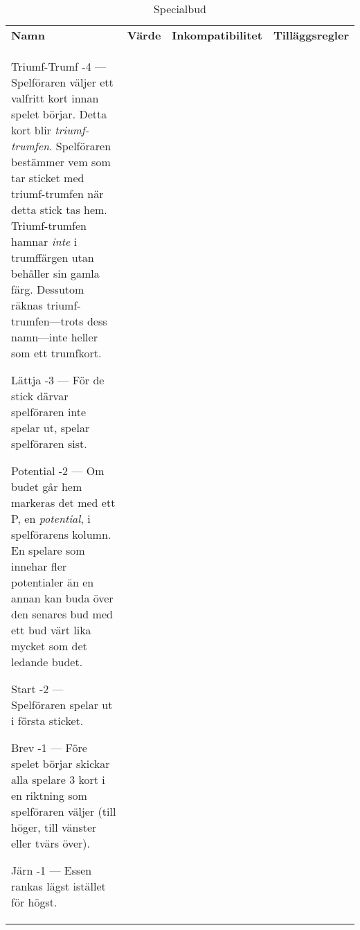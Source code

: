 %
%
%
%

\begin{table}
	\caption{Specialbud}\label{tab:specialBids}
	\begin{center}
		\begin{tabularx}{\textwidth}{
			l
			S[table-number-alignment=center, table-format=1.0]
			p{3cm}
			|X
		}
			\textbf{Namn} &
			\textbf{Värde} &
			\textbf{Inkompatibilitet} &
			\textbf{Tilläggsregler}
			\\[-3ex]

			\specialBidItem%
			{Triumf-Trumf}
			{-4}
			{---}
			{%
				Spelföraren väljer ett valfritt kort innan spelet börjar. Detta kort blir \emph{triumf-trumfen}. Spelföraren bestämmer vem som tar sticket med triumf-trumfen när detta stick tas hem. Triumf-trumfen hamnar \emph{inte} i trumffärgen utan behåller sin gamla färg. Dessutom räknas triumf-trumfen---trots dess namn---inte heller som ett trumfkort.
			}

			\specialBidItem%
			{Lättja}
			{-3}
			{---}
			{%
				För de stick därvar spelföraren inte spelar ut, spelar spelföraren sist.
			}

			\specialBidItem%
			{Potential}
			{-2}
			{---}
			{%
				Om budet går hem markeras det med ett P, en \emph{potential}, i spelförarens kolumn. En spelare som innehar fler potentialer än en annan kan buda över den senares bud med ett bud värt lika mycket som det ledande budet.
			}

			\specialBidItem%
			{Start}
			{-2}
			{---}
			{%
				Spelföraren spelar ut i första sticket.
			}

			\specialBidItem%
			{Brev}
			{-1}
			{---}
			{%
				Före spelet börjar skickar alla spelare 3 kort i en riktning som spelföraren väljer (till höger, till vänster eller tvärs över).
			}

			\specialBidItem%
			{Järn}
			{-1}
			{---}
			{%
				Essen rankas lägst istället för högst.
			}


\end{tabularx}
\end{center}
\end{table}
